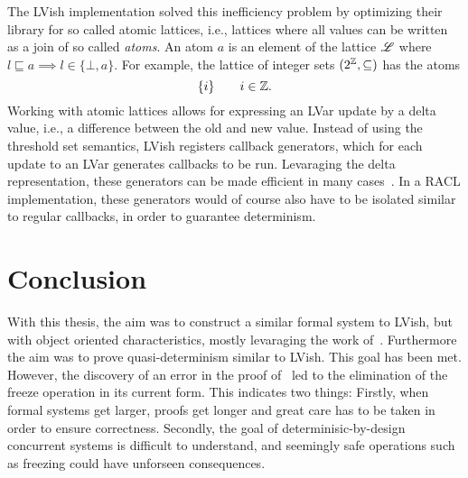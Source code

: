 The LVish implementation solved this inefficiency problem by optimizing their
library for so called atomic lattices, i.e., lattices where all values can be
written as a join of so called \emph{atoms}. An atom $a$ is an element of the
lattice $\mbox{$\mathscr{L}$}$ where $l \sqsubseteq a \implies l \in \{\bot, a\}$. For
example, the lattice of integer sets $(2^{\mathbb{Z}}, \subseteq)$ has the atoms
\begin{equation*}
  \{ i \} \quad\quad i \in \mathbb{Z}.
\end{equation*}
Working with atomic lattices allows for expressing an LVar update by a delta
value, i.e., a difference between the old and new value. Instead of using the
threshold set semantics, LVish registers callback generators, which for each
update to an LVar generates callbacks to be run. Levaraging the delta
representation, these generators can be made efficient in many
cases~\parencite{kuper2014freeze}. In a RACL implementation, these generators
would of course also have to be isolated similar to regular callbacks, in
order to guarantee determinism.


\section{Conclusion}%
\label{sec:conclusion}

With this thesis, the aim was to construct a similar formal system to LVish, but
with object oriented characteristics, mostly levaraging the work
of~\textcite{conf/oopsla/HallerL16}. Furthermore the aim was to prove
quasi-determinism similar to LVish. This goal has been met.  However, the
discovery of an error in the proof of~\textcite{kuper2014freezeTR} led to the
elimination of the freeze operation in its current form. This indicates two
things: Firstly, when formal systems get larger, proofs get longer and great
care has to be taken in order to ensure correctness. Secondly, the goal of
determinisic-by-design concurrent systems is difficult to understand, and
seemingly safe operations such as freezing could have unforseen consequences.






